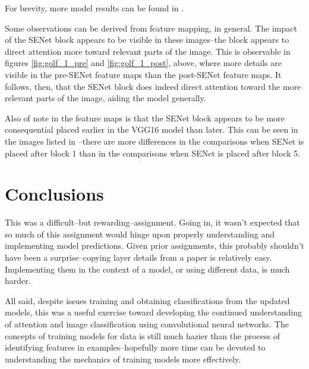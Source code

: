 \documentclass{article}
\begin{document}
\par For brevity, more model results can be found in .
\par Some observations can be derived from feature mapping, in general. 
The impact of the SENet block appears to be visible in these images--the block appears to direct attention more toward relevant parts of the image.
This is observable in figures \ref{fig:golf_1_pre} and \ref{fig:golf_1_post}, above, where more details are visible in the pre-SENet feature maps than the post-SENet feature maps.
It follows, then, that the SENet block does indeed direct attention toward the more relevant parts of the image, aiding the model generally.

\par Also of note in the feature maps is that the SENet block appears to be more consequential placed earlier in the VGG16 model than later.
This can be seen in the images listed in --there are more differences in the comparisons when SENet is placed after block 1 than in the comparisons when SENet is placed after block 5.

\section{Conclusions}
\par This was a difficult--but rewarding--assignment. Going in, it wasn't expected that so much of this assignment would hinge upon properly understanding and implementing model predictions.
Given prior assignments, this probably shouldn't have been a surprise--copying layer details from a paper is relatively easy.
Implementing them in the context of a model, or using different data, is much harder.

\par All said, despite issues training and obtaining classifications from the updated models, this was a useful exercise toward developing the continued understanding of attention and image classification using convolutional neural networks.
The concepts of training models for data is still much hazier than the process of identifying features in examples--hopefully more time can be devoted to understanding the mechanics of training models more effectively.



\end{document}
